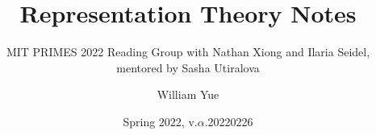 \documentclass[11pt, oneside]{scrbook}
\begin{document}
\title{Representation Theory Notes}
\subtitle{MIT PRIMES 2022 Reading Group with Nathan Xiong and Ilaria Seidel, mentored by Sasha Utiralova}
\author{William Yue}
\date{Spring 2022, v.$\alpha$.20220226}
\maketitle



\end{document}
